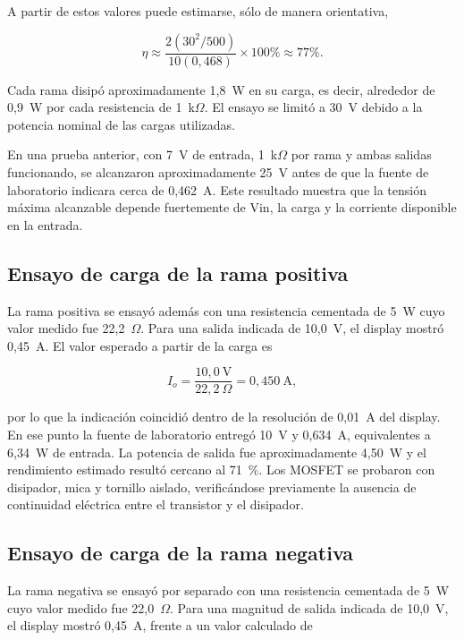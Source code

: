 \documentclass[conference]{IEEEtran}
\begin{document}
A partir de estos valores puede estimarse, sólo de manera orientativa,

\begin{equation}
\eta\approx\frac{2(30^2/500)}{10(0,468)}\times100\%\approx77\%.
\end{equation}

Cada rama disipó aproximadamente 1,8~W en su carga, es decir, alrededor de 0,9~W por cada resistencia de 1~k$\Omega$. El ensayo se limitó a 30~V debido a la potencia nominal de las cargas utilizadas.

En una prueba anterior, con 7~V de entrada, 1~k$\Omega$ por rama y ambas salidas funcionando, se alcanzaron aproximadamente 25~V antes de que la fuente de laboratorio indicara cerca de 0,462~A. Este resultado muestra que la tensión máxima alcanzable depende fuertemente de Vin, la carga y la corriente disponible en la entrada.

\subsection{Ensayo de carga de la rama positiva}

La rama positiva se ensayó además con una resistencia cementada de 5~W cuyo valor medido fue 22,2~$\Omega$. Para una salida indicada de 10,0~V, el display mostró 0,45~A. El valor esperado a partir de la carga es

\begin{equation}
I_o=\frac{10,0\ \mathrm{V}}{22,2\ \Omega}=0,450\ \mathrm{A},
\end{equation}

por lo que la indicación coincidió dentro de la resolución de 0,01~A del display. En ese punto la fuente de laboratorio entregó 10~V y 0,634~A, equivalentes a 6,34~W de entrada. La potencia de salida fue aproximadamente 4,50~W y el rendimiento estimado resultó cercano al 71~\%. Los MOSFET se probaron con disipador, mica y tornillo aislado, verificándose previamente la ausencia de continuidad eléctrica entre el transistor y el disipador.

\subsection{Ensayo de carga de la rama negativa}

La rama negativa se ensayó por separado con una resistencia cementada de 5~W cuyo valor medido fue 22,0~$\Omega$. Para una magnitud de salida indicada de 10,0~V, el display mostró 0,45~A, frente a un valor calculado de
\end{document}
